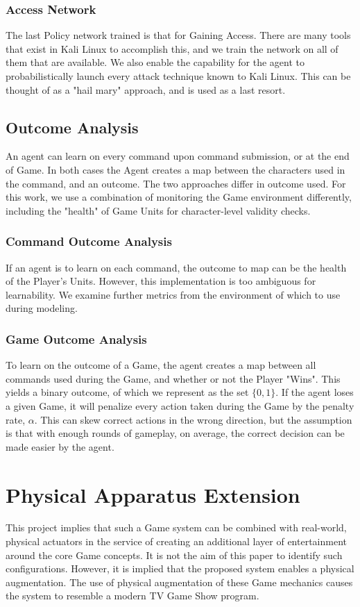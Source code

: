 \documentclass[10pt, titlepage, twocolumn]{article}
\newcommand{\ii}{\indent\indent}
\begin{document}
\subsubsection{Access Network}
\ii
The last Policy network trained is that for Gaining Access. There are many tools that exist in Kali Linux to accomplish this, and we train the network on all of them that are available. We also enable the capability for the agent to probabilistically launch every attack technique known to Kali Linux. This can be thought of as a "hail mary" approach, and is used as a last resort.



\subsection{Outcome Analysis}
\ii
An agent can learn on every command upon command submission, or at the end of Game. In both cases the Agent creates a map between the characters used in the command, and an outcome. The two approaches differ in outcome used. For this work, we use a combination of monitoring the Game environment differently, including the "health" of Game Units for character-level validity checks.

\subsubsection{Command Outcome Analysis}
\ii
If an agent is to learn on each command, the outcome to map can be the health of the Player's Units. However, this implementation is too ambiguous for learnability. We examine further metrics from the environment of which to use during modeling.


\subsubsection{Game Outcome Analysis}
\ii
To learn on the outcome of a Game, the agent creates a map between all commands used during the Game, and whether or not the Player "Wins". This yields a binary outcome, of which we represent as the set \(\{0,1\}\). If the agent loses a given Game, it will penalize every action taken during the Game by the penalty rate, \(\alpha\). This can skew correct actions in the wrong direction, but the assumption is that with enough rounds of gameplay, on average, the correct decision can be made easier by the agent.


\section{Physical Apparatus Extension}
This project implies that such a Game system can be combined with real-world, physical actuators in the service of creating an additional layer of entertainment around the core Game concepts. It is not the aim of this paper to identify such configurations. However, it is implied that the proposed system enables a physical augmentation. The use of physical augmentation of these Game mechanics causes the system to resemble a modern TV Game Show program.
\end{document}
